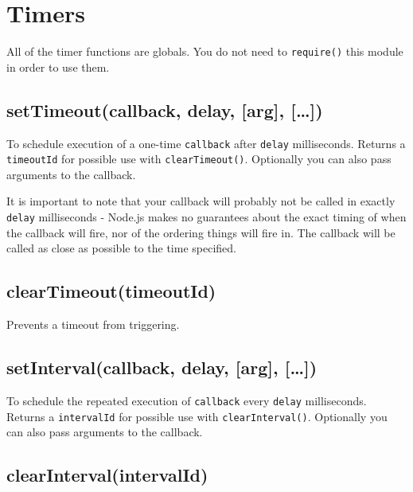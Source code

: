 \section{Timers}

\begin{Shaded}
\begin{Highlighting}[]
\NormalTok{: } 
\end{Highlighting}
\end{Shaded}

All of the timer functions are globals. You do not need to
\texttt{require()} this module in order to use them.

\subsection{setTimeout(callback, delay, {[}arg{]}, {[}\ldots{}{]})}

To schedule execution of a one-time \texttt{callback} after
\texttt{delay} milliseconds. Returns a \texttt{timeoutId} for possible
use with \texttt{clearTimeout()}. Optionally you can also pass arguments
to the callback.

It is important to note that your callback will probably not be called
in exactly \texttt{delay} milliseconds - Node.js makes no guarantees
about the exact timing of when the callback will fire, nor of the
ordering things will fire in. The callback will be called as close as
possible to the time specified.

\subsection{clearTimeout(timeoutId)}

Prevents a timeout from triggering.

\subsection{setInterval(callback, delay, {[}arg{]}, {[}\ldots{}{]})}

To schedule the repeated execution of \texttt{callback} every
\texttt{delay} milliseconds. Returns a \texttt{intervalId} for possible
use with \texttt{clearInterval()}. Optionally you can also pass
arguments to the callback.

\subsection{clearInterval(intervalId)}


